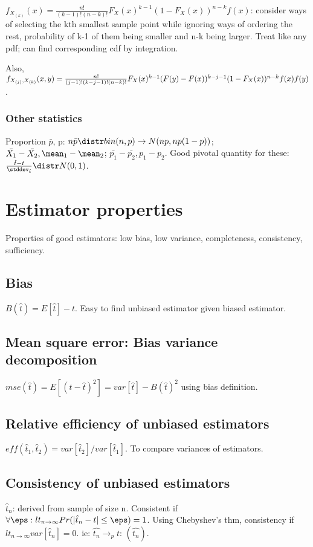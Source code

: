 \documentclass[oneside, article]{memoir}
\begin{document}
$f_{X_{(k)}}(x) = \frac{n!}{(k-1)!(n-k)!}F_{X}(x)^{k-1}(1-F_{X}(x))^{n-k}f(x)$: consider ways of selecting the kth smallest sample point while ignoring ways of ordering the rest, probability of k-1 of them being smaller and n-k being larger. Treat like any pdf; can find corresponding cdf by integration.

Also, $f_{X_{(j)}, X_{(k)}}(x, y) =\\ \frac{n!}{(j-1)!(k-j-1)!(n-k)!}F_{X}(x)^{k-1}(F(y)-F(x))^{k-j-1}(1-F_{X}(x))^{n-k}f(x)f(y)$.

\subsubsection{Other statistics}
Proportion $\bar{p}$, p: $n\bar{p} \distr bin(n, p) \to N(np, np(1-p))$; $\bar{X_{1}} - \bar{X_{2}}, \mean_{1} - \mean_{2}$; $\bar{p_{1}} - \bar{p_{2}}, p_{1} - p_{2}$. Good pivotal quantity for these: $\frac{\hat{t}-t}{\stddev_{\hat{t}}} \distr N(0, 1)$.

\section{Estimator properties}
Properties of good estimators: low bias, low variance, completeness, consistency, sufficiency.

\subsection{Bias}
$B(\hat{t}) = E[\hat{t}] - t$. Easy to find unbiased estimator given biased estimator.

\subsection{Mean square error: Bias variance decomposition}
$mse(\hat{t}) = E[(t-\hat{t})^{2}] = var[\hat{t}] - B(\hat{t})^{2}$ using bias definition.

\subsection{Relative efficiency of unbiased estimators}
$eff(\hat{t}_{1}, \hat{t}_2) = var[\hat{t}_{2}]/var[\hat{t}_{1}]$. To compare variances of estimators.

\subsection{Consistency of unbiased estimators}
$\hat{t}_{n}$: derived from sample of size n. Consistent if $\forall \eps: lt_{n \to \infty} Pr(|\hat{t}_{n} - t| \leq \eps) = 1$. Using Chebyshev's thm, consistency if $lt_{n \to \infty}var[\hat{t}_{n}] = 0$. ie: $\hat{t_{n}} \to_{p} t$: $(\hat{t_{n}})$.
\end{document}
